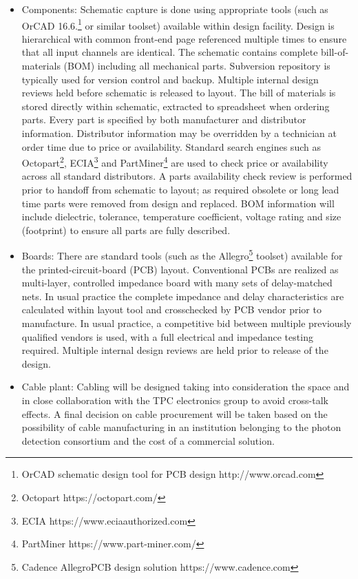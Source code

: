 \begin{itemize}

\item Components: Schematic capture is done using appropriate tools (such as OrCAD 16.6.\footnote{OrCAD\texttrademark{} schematic design tool for PCB design http://www.orcad.com} or similar toolset) available within design facility. Design is hierarchical with common front-end page referenced multiple times to ensure that all input channels are identical. The schematic contains complete bill-of-materials (BOM) including all mechanical parts. Subversion repository is typically used for version control and backup. Multiple internal design reviews held before schematic is released to layout. The bill of materials is stored directly within schematic, extracted to spreadsheet when ordering parts. Every part is specified by both manufacturer and distributor information. Distributor information may be overridden by a technician at order time due to price or availability. Standard search engines such as Octopart\footnote{Octopart https://octopart.com/}, ECIA\footnote{ ECIA https://www.eciaauthorized.com} and PartMiner\footnote{PartMiner https://www.part-miner.com/} are used to check price or availability across all standard distributors. A parts availability check review is performed prior to handoff from schematic to layout; as required obsolete or long lead time parts were removed from design and replaced. BOM information will include dielectric, tolerance, temperature coefficient, voltage rating and size (footprint) to ensure all parts are fully described.

\item Boards: There are standard tools (such as the Allegro\footnote{Cadence Allegro\textregistered PCB design solution https://www.cadence.com} toolset) available for the printed-circuit-board (PCB) layout. Conventional PCBs are realized as multi-layer, controlled impedance board with many sets of delay-matched nets. In usual practice the complete impedance and delay characteristics are calculated within layout tool and crosschecked by PCB vendor prior to manufacture. In usual practice, a competitive bid between multiple previously qualified vendors is used, with a full electrical and impedance testing required. Multiple internal design reviews are held prior to release of the design.

\item Cable plant: Cabling will be designed taking into consideration the  space and in close collaboration with the TPC electronics group to avoid cross-talk effects. A final decision on cable procurement will be taken based on the possibility of cable manufacturing in an institution belonging to the photon detection consortium and the cost of a commercial solution.  


\end{itemize}
